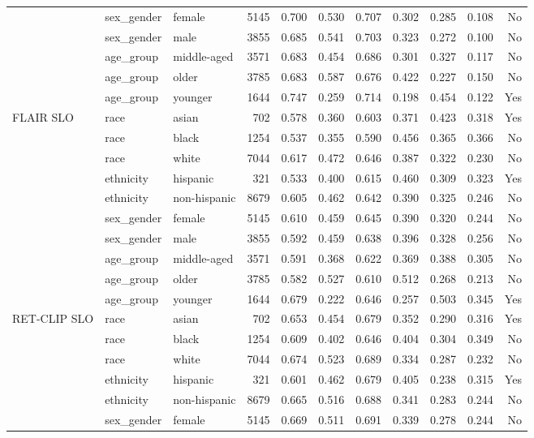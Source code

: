 \begin{longtable}{@{}lllrrrrrrrr@{}}
 & sex\_gender & female & 5145 & 0.700 & 0.530 & 0.707 & 0.302 & 0.285 & 0.108 & No \\
 & sex\_gender & male & 3855 & 0.685 & 0.541 & 0.703 & 0.323 & 0.272 & 0.100 & No \\
 & age\_group & middle-aged & 3571 & 0.683 & 0.454 & 0.686 & 0.301 & 0.327 & 0.117 & No \\
 & age\_group & older & 3785 & 0.683 & 0.587 & 0.676 & 0.422 & 0.227 & 0.150 & No \\
 & age\_group & younger & 1644 & 0.747 & 0.259 & 0.714 & 0.198 & 0.454 & 0.122 & Yes \\
FLAIR SLO & race & asian & 702 & 0.578 & 0.360 & 0.603 & 0.371 & 0.423 & 0.318 & Yes \\
 & race & black & 1254 & 0.537 & 0.355 & 0.590 & 0.456 & 0.365 & 0.366 & No \\
 & race & white & 7044 & 0.617 & 0.472 & 0.646 & 0.387 & 0.322 & 0.230 & No \\
 & ethnicity & hispanic & 321 & 0.533 & 0.400 & 0.615 & 0.460 & 0.309 & 0.323 & Yes \\
 & ethnicity & non-hispanic & 8679 & 0.605 & 0.462 & 0.642 & 0.390 & 0.325 & 0.246 & No \\
 & sex\_gender & female & 5145 & 0.610 & 0.459 & 0.645 & 0.390 & 0.320 & 0.244 & No \\
 & sex\_gender & male & 3855 & 0.592 & 0.459 & 0.638 & 0.396 & 0.328 & 0.256 & No \\
 & age\_group & middle-aged & 3571 & 0.591 & 0.368 & 0.622 & 0.369 & 0.388 & 0.305 & No \\
 & age\_group & older & 3785 & 0.582 & 0.527 & 0.610 & 0.512 & 0.268 & 0.213 & No \\
 & age\_group & younger & 1644 & 0.679 & 0.222 & 0.646 & 0.257 & 0.503 & 0.345 & Yes \\
RET-CLIP SLO & race & asian & 702 & 0.653 & 0.454 & 0.679 & 0.352 & 0.290 & 0.316 & Yes \\
 & race & black & 1254 & 0.609 & 0.402 & 0.646 & 0.404 & 0.304 & 0.349 & No \\
 & race & white & 7044 & 0.674 & 0.523 & 0.689 & 0.334 & 0.287 & 0.232 & No \\
 & ethnicity & hispanic & 321 & 0.601 & 0.462 & 0.679 & 0.405 & 0.238 & 0.315 & Yes \\
 & ethnicity & non-hispanic & 8679 & 0.665 & 0.516 & 0.688 & 0.341 & 0.283 & 0.244 & No \\
 & sex\_gender & female & 5145 & 0.669 & 0.511 & 0.691 & 0.339 & 0.278 & 0.244 & No \\

\end{longtable}
